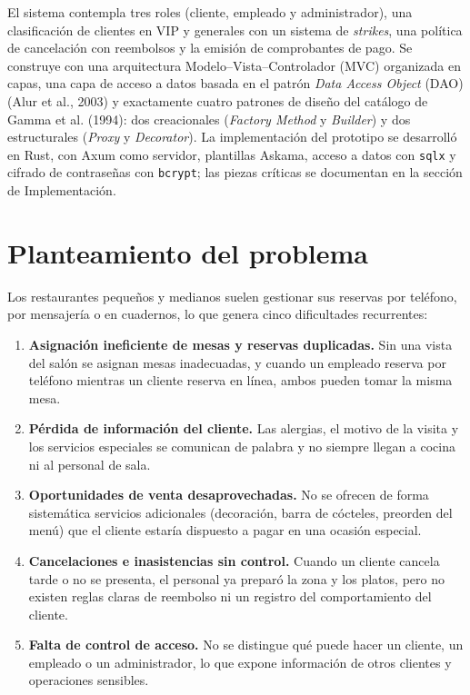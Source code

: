 \documentclass[12pt]{article}
\begin{document}
El sistema contempla tres roles (cliente, empleado y administrador), una clasificación de clientes en VIP y generales con un sistema de \textit{strikes}, una política de cancelación con reembolsos y la emisión de comprobantes de pago. Se construye con una arquitectura Modelo--Vista--Controlador (MVC) organizada en capas, una capa de acceso a datos basada en el patrón \textit{Data Access Object} (DAO) (Alur et al., 2003) y exactamente cuatro patrones de diseño del catálogo de Gamma et al. (1994): dos creacionales (\textit{Factory Method} y \textit{Builder}) y dos estructurales (\textit{Proxy} y \textit{Decorator}). La implementación del prototipo se desarrolló en Rust, con Axum como servidor, plantillas Askama, acceso a datos con \texttt{sqlx} y cifrado de contraseñas con \texttt{bcrypt}; las piezas críticas se documentan en la sección de Implementación.

\section{Planteamiento del problema}
Los restaurantes pequeños y medianos suelen gestionar sus reservas por teléfono, por mensajería o en cuadernos, lo que genera cinco dificultades recurrentes:

\begin{enumerate}
  \item \textbf{Asignación ineficiente de mesas y reservas duplicadas.} Sin una vista del salón se asignan mesas inadecuadas, y cuando un empleado reserva por teléfono mientras un cliente reserva en línea, ambos pueden tomar la misma mesa.
  \item \textbf{Pérdida de información del cliente.} Las alergias, el motivo de la visita y los servicios especiales se comunican de palabra y no siempre llegan a cocina ni al personal de sala.
  \item \textbf{Oportunidades de venta desaprovechadas.} No se ofrecen de forma sistemática servicios adicionales (decoración, barra de cócteles, preorden del menú) que el cliente estaría dispuesto a pagar en una ocasión especial.
  \item \textbf{Cancelaciones e inasistencias sin control.} Cuando un cliente cancela tarde o no se presenta, el personal ya preparó la zona y los platos, pero no existen reglas claras de reembolso ni un registro del comportamiento del cliente.
  \item \textbf{Falta de control de acceso.} No se distingue qué puede hacer un cliente, un empleado o un administrador, lo que expone información de otros clientes y operaciones sensibles.
\end{enumerate}
\end{document}

